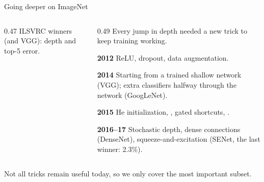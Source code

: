 \documentclass[11pt,aspectratio=169]{beamer}
\begin{document}
\begin{frame}{Going deeper on ImageNet}
\begin{columns}[c,onlytextwidth]
\begin{column}{0.47\textwidth}
            {\scriptsize ILSVRC winners (and VGG): depth and top-5 error.}
        \end{column}
        \begin{column}{0.49\textwidth}%
            \small%
            \setlength{\parskip}{4pt}%
            \RaggedRight\setlength{\parindent}{0pt}%
            Every jump in depth needed a new trick to keep training working.

            \textbf{2012} ReLU, dropout, data augmentation.

            \textbf{2014} Starting from a trained shallow network (VGG);
            extra classifiers halfway through the network (GoogLeNet).

            \textbf{2015} He initialization, ,
            gated shortcuts, .

            \textbf{2016--17} Stochastic depth, dense connections (DenseNet),
            squeeze-and-excitation (SENet, the last winner: 2.3\%).
        \end{column}
    \end{columns}

    \medskip
    Not all tricks remain useful today, so we only cover the most important
    subset.


\end{frame}
\end{document}
